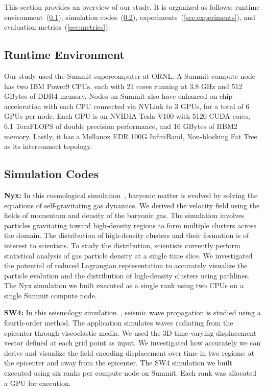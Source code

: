 This section provides an overview of our study. It is organized as follows: runtime environment~(\ref{sec:runtime}), simulation codes~(\ref{sec:simulations}), experiments~(\ref{sec:experiments}), and evaluation metrics~(\ref{sec:metrics}). %

\vspace{-1mm}
\subsection{Runtime Environment}
\label{sec:runtime}
Our study used the Summit supercomputer at ORNL.
%
A Summit compute node has two IBM Power9 CPUs, each with 21 cores running at 3.8 GHz and 512 GBytes of DDR4 memory.
%
Nodes on Summit also have enhanced on-chip acceleration with each CPU connected via NVLink to 3 GPUs, for a total of 6 GPUs per node.
%
Each GPU is an NVIDIA Tesla V100 with 5120 CUDA cores, 6.1 TeraFLOPS of double precision performance, and 16 GBytes of HBM2 memory.
%
Lastly, it has a Mellanox EDR 100G InfiniBand, Non-blocking Fat Tree as its interconnect topology.

\vspace{-1mm}
\subsection{Simulation Codes}
\label{sec:simulations}

\textbf{Nyx:} In this cosmological simulation~\cite{almgren2013nyx}, baryonic matter is evolved by solving the equations of self-gravitating gas dynamics.
%
We derived the velocity field using the fields of momentum and density of the baryonic gas.
%
The simulation involves particles gravitating toward high-density regions to form multiple clusters across the domain. 
%
The distribution of high-density clusters and their formation is of interest to scientists.
%
To study the distribution, scientists currently perform statistical analysis of gas particle density at a single time slice.
%
We investigated the potential of reduced Lagrangian representation to accurately visualize the particle evolution and the distribution of high-density clusters using pathlines.
%
%
The Nyx simulation we built executed as a single rank using two CPUs on a single Summit compute node.
%

\noindent\textbf{SW4:} In this seismology simulation~\cite{petersson2015wave}, seismic wave propagation is studied using a fourth-order method.
%
The application simulates waves radiating from the epicenter through viscoelastic media. 
%
%
We used the 3D time-varying displacement vector defined at each grid point as input.
%
We investigated how accurately we can derive and visualize the field encoding displacement over time in two regions: at the epicenter and away from the epicenter.
%
The SW4 simulation we built executed using six ranks per compute node on Summit. Each rank was allocated a GPU for execution.
%

